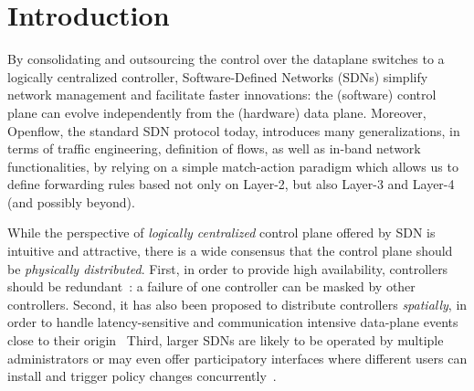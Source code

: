 \documentclass[conference]{sigcomm-alternate}
\begin{document}


%
%
%
%
%
%

\section{Introduction}\label{sec:intro}
By consolidating and outsourcing the control over the dataplane switches to a logically
centralized controller, Software-Defined Networks (SDNs)
simplify network management and facilitate faster innovations:
the (software) control plane can evolve independently from the
(hardware) data plane.
Moreover, Openflow, the standard SDN protocol today, introduces many generalizations,
in terms of traffic engineering, definition of flows, as well as in-band network functionalities,
by relying on a simple match-action paradigm which allows us to define
forwarding rules based not only on Layer-2, but also Layer-3 and Layer-4 (and possibly beyond).

While the perspective of \emph{logically centralized} control plane
offered by SDN is intuitive and attractive,
there is a wide consensus that
the control plane should be  \emph{physically distributed}.
First, in order to provide high availability, 
controllers should be redundant~\cite{onix,stn,onos}: a failure
of one controller can be masked by other controllers. 
Second, it has also been proposed to distribute controllers \emph{spatially}, in order to handle latency-sensitive and
communication intensive 
data-plane
events close to their origin~\cite{devoflow,kandoo,jukka,disco}
Third, larger SDNs are likely to be operated by multiple administrators or may even offer
participatory interfaces where different users can install and trigger policy changes
concurrently~\cite{participatory,stn}.
\end{document}
